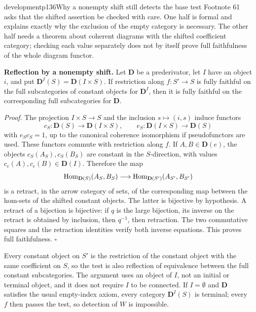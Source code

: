 \begin{dcomment}{development}{p136}{Why a nonempty shift still detects the base test}
Footnote 61 asks that the shifted assertion be checked with care. One half is formal and explains exactly why the exclusion of the empty category is necessary. The other half needs a theorem about coherent diagrams with the shifted coefficient category; checking each value separately does not by itself prove full faithfulness of the whole diagram functor.

\textbf{Reflection by a nonempty shift.}\ours
Let $\mathbf D$ be a prederivator, let $I$ have an object $i$, and put $\mathbf D^I(S)=\mathbf D(I\times S)$. If restriction along $f:S'\longrightarrow S$ is fully faithful on the full subcategories of constant objects for $\mathbf D^I$, then it is fully faithful on the corresponding full subcategories for $\mathbf D$.

\emph{Proof.} The projection $I\times S\longrightarrow S$ and the inclusion $s\mapsto(i,s)$ induce functors
\[
 c_S:\mathbf D(S)\longrightarrow\mathbf D(I\times S),
 \qquad e_S:\mathbf D(I\times S)\longrightarrow\mathbf D(S)
\]
with $e_Sc_S=1$, up to the canonical coherence isomorphism if pseudofunctors are used. These functors commute with restriction along $f$. If $A,B\in\mathbf D(e)$, the objects $c_S(A_S),c_S(B_S)$ are constant in the $S$-direction, with values $c_e(A),c_e(B)\in\mathbf D(I)$. Therefore the map
\[
 \mathrm{Hom}_{\mathbf D(S)}(A_S,B_S)
 \longrightarrow\mathrm{Hom}_{\mathbf D(S')}(A_{S'},B_{S'})
\]
is a retract, in the arrow category of sets, of the corresponding map between the hom-sets of the shifted constant objects. The latter is bijective by hypothesis. A retract of a bijection is bijective: if $q$ is the large bijection, its inverse on the retract is obtained by inclusion, then $q^{-1}$, then retraction. The two commutative squares and the retraction identities verify both inverse equations. This proves full faithfulness. \hfill$\square$

Every constant object on $S'$ is the restriction of the constant object with the same coefficient on $S$, so the test is also reflection of equivalence between the full constant subcategories. The argument uses an object of $I$, not an initial or terminal object, and it does not require $I$ to be connected. If $I=\emptyset$ and $\mathbf D$ satisfies the usual empty-index axiom, every category $\mathbf D^I(S)$ is terminal; every $f$ then passes the test, so detection of $W$ is impossible.


\end{dcomment}
